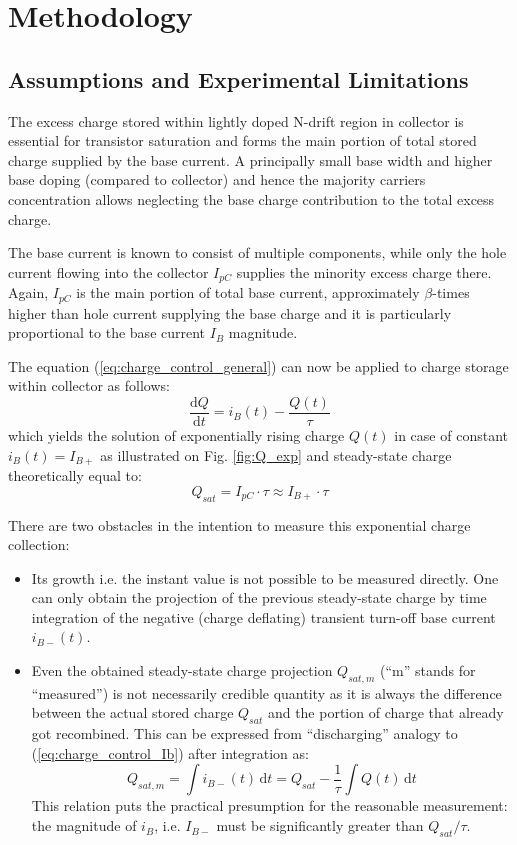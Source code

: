 \documentclass{eeict}
\newcommand{\dif}{\, \mathrm{d}}	%
\newcommand{\dxdt}[2]{\frac{\mathrm{d} #1}{\mathrm{d} #2}}
\begin{document}
\section{Methodology}
\subsection{Assumptions and Experimental Limitations}

The excess charge stored within lightly doped N-drift region in collector is essential for transistor saturation and forms the main portion of total stored charge supplied by the base current. A principally small base width and higher base doping (compared to collector) and hence the majority carriers concentration allows neglecting the base charge contribution to the total excess charge.

The base current is known to consist of multiple components, while only the hole current flowing into the collector $I_{pC}$ supplies the minority excess charge there. Again, $I_{pC}$ is the main portion of total base current, approximately $\beta$-times higher than hole current supplying the base charge and it is particularly proportional to the base current $I_B$ magnitude.

The equation (\ref{eq:charge_control_general}) can now be applied to charge storage within collector as follows:
\begin{equation}
    \dxdt{Q}{t} = i_B(t) - \frac{Q(t)}{\tau}
    \label{eq:charge_control_Ib}
\end{equation}
which yields the solution of exponentially rising charge $Q(t)$ in case of constant $i_B(t) = I_{B+}$ as illustrated on Fig. \ref{fig:Q_exp} and steady-state charge theoretically equal to:
\begin{equation}
    Q_{sat} = I_{pC} \cdot \tau \approx I_{B+} \cdot \tau
    \label{eq:Qsat_Ib*tau}
\end{equation}

There are two obstacles in the intention to measure this exponential charge collection:
\begin{itemize}
    \item Its growth i.e. the instant value is not possible to be measured directly. One can only obtain the projection of the previous steady-state charge by time integration of the negative (charge deflating) transient turn-off base current $i_{B-}(t)$.
    \item Even the obtained steady-state charge projection $Q_{sat,m}$ (``m'' stands for ``measured'') is not necessarily credible quantity as it is always the difference between the actual stored charge $Q_{sat}$ and the portion of charge that already got recombined. This can be expressed from ``discharging'' analogy to (\ref{eq:charge_control_Ib}) after integration as:
	\begin{equation}
	    Q_{sat,m} = \int i_{B-}(t) \dif t = Q_{sat} - \frac{1}{\tau} \int Q(t)\dif t
	    \label{eq:rekomb_efekt}
	\end{equation}
	This relation puts the practical presumption for the reasonable measurement: the magnitude of $i_B$, i.e. $I_{B-}$ must be significantly greater than $Q_{sat} / \tau$.
\end{itemize}
\end{document}
